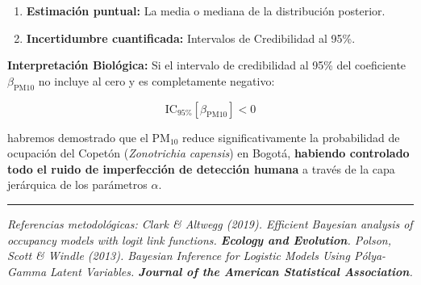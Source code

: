 \documentclass[12pt]{article}
\begin{document}
\begin{enumerate}
  \item \textbf{Estimación puntual:} La media o mediana de la distribución posterior.
  \item \textbf{Incertidumbre cuantificada:} Intervalos de Credibilidad al 95\%.
\end{enumerate}

\medskip
\textbf{Interpretación Biológica:}
Si el intervalo de credibilidad al 95\% del coeficiente $\beta_{\text{PM10}}$ no incluye al cero y es completamente negativo:

\begin{equation}
  \text{IC}_{95\%}[\beta_{\text{PM10}}] < 0
\end{equation}

habremos demostrado que el $\text{PM}_{10}$ reduce significativamente la probabilidad de ocupación del Copetón (\textit{Zonotrichia capensis}) en Bogotá, \textbf{habiendo controlado todo el ruido de imperfección de detección humana} a través de la capa jerárquica de los parámetros $\alpha$.

\vfill
\noindent\rule{\textwidth}{0.4pt}
\small\textit{Referencias metodológicas: Clark \& Altwegg (2019). Efficient Bayesian analysis of occupancy models with logit link functions. \textbf{Ecology and Evolution}. Polson, Scott \& Windle (2013). Bayesian Inference for Logistic Models Using Pólya-Gamma Latent Variables. \textbf{Journal of the American Statistical Association}.}
\end{document}
